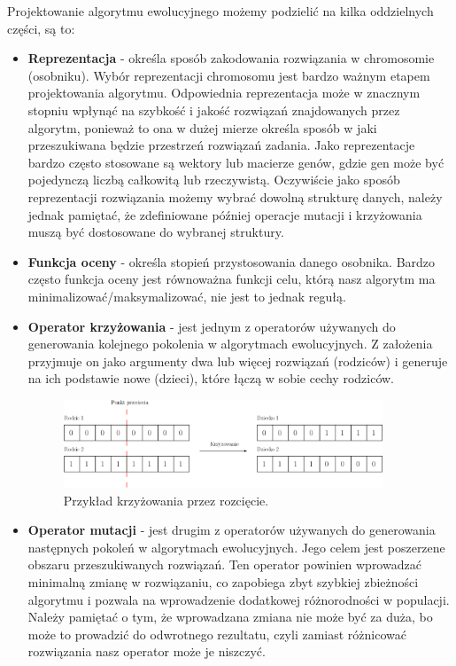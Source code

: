 Projektowanie algorytmu ewolucyjnego możemy podzielić na kilka oddzielnych części, są to: 
\begin{itemize}
    \item \textbf{Reprezentacja} - określa sposób zakodowania rozwiązania w chromosomie (osobniku). Wybór reprezentacji chromosomu jest bardzo ważnym etapem 
    projektowania algorytmu. Odpowiednia reprezentacja może w znacznym stopniu wpłynąć na szybkość i jakość rozwiązań znajdowanych przez 
    algorytm, ponieważ to ona w dużej mierze określa sposób w jaki przeszukiwana będzie przestrzeń rozwiązań zadania. 
    Jako reprezentacje bardzo często stosowane są wektory lub macierze genów, gdzie gen może być pojedynczą liczbą całkowitą lub rzeczywistą. 
    Oczywiście jako sposób reprezentacji rozwiązania możemy wybrać dowolną strukturę danych, należy jednak pamiętać, że zdefiniowane później 
    operacje mutacji i krzyżowania muszą być dostosowane do wybranej struktury.
    
    \item \textbf{Funkcja oceny} - określa stopień przystosowania danego osobnika. Bardzo często funkcja oceny jest równoważna funkcji celu, którą 
    nasz algorytm ma minimalizować/maksymalizować, nie jest to jednak regułą. 

    \item \textbf{Operator krzyżowania} - jest jednym z operatorów używanych do generowania kolejnego pokolenia w algorytmach ewolucyjnych. Z założenia 
    przyjmuje on jako argumenty dwa lub więcej rozwiązań (rodziców) i generuje na ich podstawie nowe (dzieci), które łączą w sobie cechy rodziców. 
    
    \begin{figure}[H]
        \centering        
        \includegraphics[width=0.9\textwidth]{img/cross_example.png}
        \caption{Przykład krzyżowania przez rozcięcie.}
    \end{figure}

    \item \textbf{Operator mutacji} - jest drugim z operatorów używanych do generowania następnych pokoleń w algorytmach ewolucyjnych. Jego celem jest 
    poszerzene obszaru przeszukiwanych rozwiązań. Ten operator powinien wprowadzać minimalną zmianę w rozwiązaniu, co zapobiega zbyt szybkiej 
    zbieżności algorytmu i pozwala na wprowadzenie dodatkowej różnorodności w populacji. Należy pamiętać o tym, że wprowadzana zmiana nie może 
    być za duża, bo może to prowadzić do odwrotnego rezultatu, czyli zamiast różnicować rozwiązania nasz operator może je niszczyć.
    

\end{itemize}
